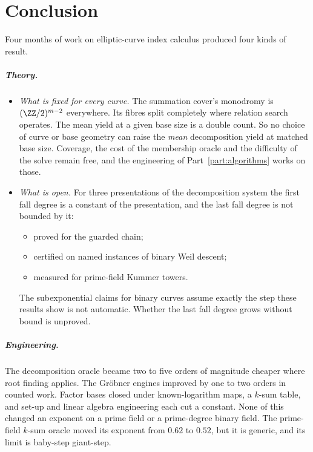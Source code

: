 \chapter{Conclusion}\label{ch:conclusion}

Four months of work on elliptic-curve index calculus produced four kinds of
result.

\paragraph{Theory.}
\begin{itemize}
\item \emph{What is fixed for every curve.} The summation cover's monodromy
  is $(\ZZ/2)^{m-2}$ everywhere. Its fibres split completely where relation
  search operates. The mean yield at a given base size is a double count.
  So no choice of curve or base geometry can raise the \emph{mean}
  decomposition yield at matched base size. Coverage, the cost of the
  membership oracle and the difficulty of the solve remain free, and the
  engineering of Part~\ref{part:algorithms} works on those.
\item \emph{What is open.} For three presentations of the decomposition
  system the first fall degree is a constant of the presentation, and the
  last fall degree is not bounded by it:
  \begin{itemize}
  \item proved for the guarded chain;
  \item certified on named instances of binary Weil descent;
  \item measured for prime-field Kummer towers.
  \end{itemize}
  The subexponential claims for binary curves assume exactly the step
  these results show is not automatic. Whether the last fall degree grows
  without bound is unproved.
\end{itemize}

\paragraph{Engineering.} The decomposition oracle became two to five
orders of magnitude cheaper where root finding applies. The Gröbner
engines improved by one to two orders in counted work. Factor bases
closed under known-logarithm maps, a $k$-sum table, and set-up and linear
algebra engineering each cut a constant. None of this changed an exponent
on a prime field or a prime-degree binary field. The prime-field $k$-sum
oracle moved its exponent from $0.62$ to $0.52$, but it is generic, and
its limit is baby-step giant-step.

